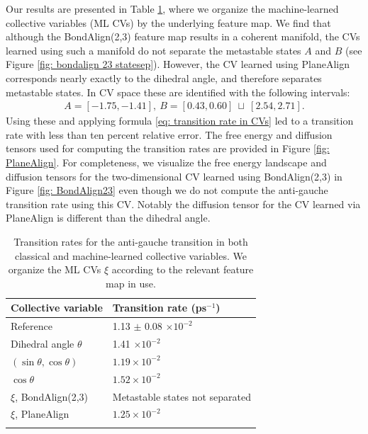 \documentclass[reqno, 12pt]{article}
\begin{document}
Our results are presented in Table \ref{tab: transition rates}, where we organize the machine-learned collective variables (ML CVs) by the underlying feature map. We find that although the {\sf BondAlign(2,3)} feature map results in a coherent manifold, the CVs learned using such a manifold do not separate the metastable states $A$ and $B$ (see Figure \ref{fig: bondalign 23 statesep}). However, the CV learned using {\sf PlaneAlign} corresponds nearly exactly to the dihedral angle, and therefore separates metastable states. In CV space these are identified with the following intervals: 
\begin{align}
    A = [-1.75,-1.41], \: B = [0.43, 0.60] \: \sqcup \: [2.54, 2.71].
\end{align}
Using these and applying formula \eqref{eq: transition rate in CVs} led to a transition rate with less than ten percent relative error. The free energy and diffusion tensors used for computing the transition rates are provided in Figure \eqref{fig: PlaneAlign}. For completeness, we visualize the free energy landscape and diffusion tensors for the two-dimensional CV learned using {\sf BondAlign(2,3)} in Figure \ref{fig: BondAlign23} even though we do not compute the anti-gauche transition rate using this CV. Notably the diffusion tensor for the CV learned via PlaneAlign is different than the dihedral angle.
\begin{table}[h!]
\begin{center}
\begin{tabular}{@{}ll@{}}
\toprule
Collective variable          & Transition rate (ps$^{-1}$)     \\ \midrule
Reference                    & 1.13 $\pm$ 0.08 $\times 10^{-2}$ \\
Dihedral angle $\theta$      & 1.41 $\times 10^{-2}$               \\
$(\sin \theta, \cos \theta)$ & $1.19 \times 10^{-2}$            \\
$\cos \theta$                & $1.52 \times 10^{-2}$ \\
$\xi$, {\sf BondAlign(2,3)}               & Metastable states not separated             \\
$\xi$, {\sf PlaneAlign}                   & $1.25 \times 10^{-2}$              \\ \bottomrule \\
\end{tabular}

\caption{Transition rates for the anti-gauche transition in both classical and machine-learned collective variables. We organize the ML CVs $\xi$ according to the relevant feature map in use.}
\label{tab: transition rates}

\end{center}
\end{table}
\end{document}
